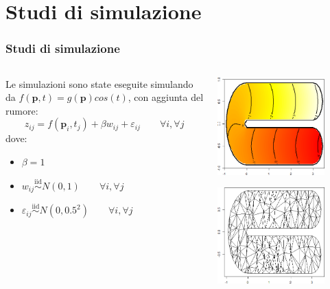\documentclass[landscape,9pt]{beamer}                           %
\begin{document}
\section{Studi di simulazione}
\begin{frame}
\frametitle{Studi di simulazione}
\begin{columns}
	\begin{column}{0.6\textwidth}
	Le simulazioni sono state eseguite simulando da $f(\bm{p},t)=g(\bm{p})cos(t)$, con aggiunta del rumore:
	$$
	z_{ij}=f(\bm p_{i},t_j) + \beta w_{ij} + \varepsilon_{ij} \qquad \forall i , \forall j 
	$$
	dove:
	\begin{itemize}
	\item $\beta=1$
	\item $w_{ij}\stackrel{\mathrm{iid}}{\sim}N(0,1) \qquad \forall i, \forall j$
	\item $\varepsilon_{ij}\stackrel{\mathrm{iid}}{\sim}N(0,0.5^2) \qquad \forall i, \forall j$
	\end{itemize}
	\end{column}
	\begin{column}{0.4\textwidth}
		\begin{center}
		\includegraphics[width=0.8\textwidth]{Immagini/DomC_fstest.png}
		\end{center}
		\begin{center}
		\includegraphics[width=0.8\textwidth]{Immagini/DomC_Triangolazione.png}

\end{center}
\end{column}
\end{columns}
\end{frame}
\end{document}
